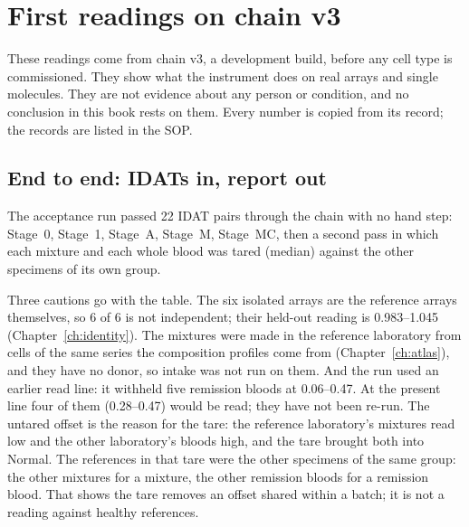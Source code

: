 \chapter{First readings on chain v3}\label{ch:firstreadings}

\begin{keybox}[title=Status of everything in this chapter]
These readings come from chain v3, a development build, before any cell type is commissioned. They show what the instrument does on real arrays and
single molecules. They are not evidence about any person or condition, and no conclusion in this book rests on them. Every number is copied from its
record; the records are listed in the SOP.
\end{keybox}

\section{End to end: IDATs in, report out}

The acceptance run passed 22 IDAT pairs through the chain with no hand step: Stage~0, Stage~1, Stage~A, Stage~M, Stage~MC, then a second
pass in which each mixture and each whole blood was tared (median) against the other specimens of its own group.
\begin{center}\small
{}
\end{center}
\measured{} Three cautions go with the table. The six isolated arrays are the reference arrays themselves, so 6 of 6 is not independent; their held-out reading is
0.983--1.045 (Chapter~\ref{ch:identity}). The mixtures were made in the reference laboratory from cells of the same series the composition profiles come from
(Chapter~\ref{ch:atlas}), and they have no donor, so intake was not run on them. And the run used an earlier read line: it withheld five remission
bloods at 0.06--0.47. At the present line four of them (0.28--0.47) would be read; they have not been re-run. \openprob{} The untared offset is the reason for the
tare: the reference laboratory's mixtures read low and the other laboratory's bloods high, and the tare brought both into Normal. The references
in that tare were the other specimens of the same group: the other mixtures for a mixture, the other remission bloods for a remission blood. That shows
the tare removes an offset shared within a batch; it is not a reading against healthy references. \measured

